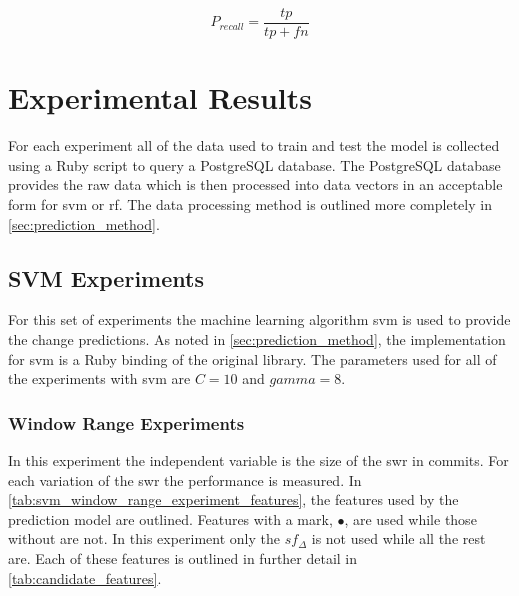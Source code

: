 \begin{equation} 
\label{eq:recall}
P_{recall} = \frac{tp}{tp+fn}
\end{equation}

\section{Experimental Results}
\label{sec:experimental_results}


For each experiment all of the data used to train and test the model is collected using a Ruby script to query a PostgreSQL database. The PostgreSQL database provides the raw data which is then processed into data vectors in an acceptable form for \gls{svm} or \gls{rf}. The data processing method is outlined more completely in \autoref{sec:prediction_method}.

\subsection{SVM Experiments}
\label{subsec:svm_experiments}

For this set of experiments the machine learning algorithm \gls{svm} is used to provide the change predictions. As noted in \autoref{sec:prediction_method}, the implementation for \gls{svm} is a Ruby binding of the original library. The parameters used for all of the experiments with \gls{svm} are $C = 10$ and $gamma = 8$.


\subsubsection{Window Range Experiments}
\label{sec:svm_swr_experiment}


In this experiment the independent variable is the size of the \gls{swr} in commits. For each variation of the \gls{swr} the performance is measured. In \autoref{tab:svm_window_range_experiment_features}, the features used by the prediction model are outlined. Features with a mark, $\bullet$, are used while those without are not. In this experiment only the $sf_{\Delta}$ is not used while all the rest are. Each of these features is outlined in further detail in \autoref{tab:candidate_features}.

